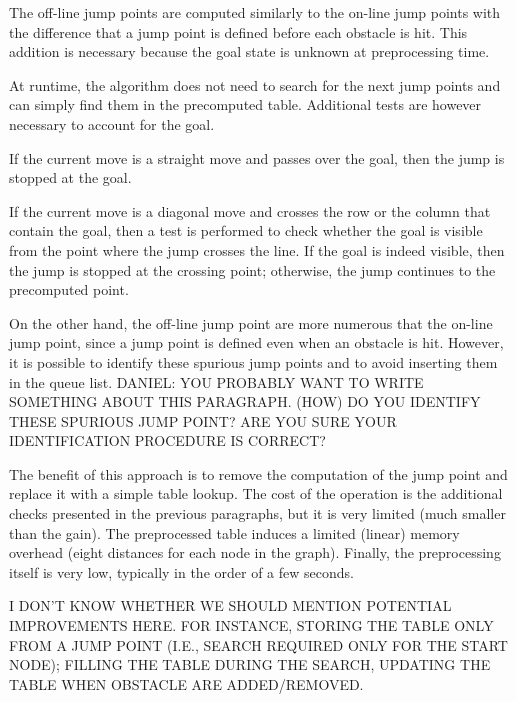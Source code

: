 The off-line jump points are computed similarly to the on-line jump points 
with the difference that a jump point is defined before each obstacle is hit.  
This addition is necessary 
because the goal state is unknown at preprocessing time.  

At runtime, the algorithm does not need to search for the next jump points 
and can simply find them in the precomputed table.  
Additional tests are however necessary to account for the goal.  

If the current move is a straight move 
and passes over the goal, 
then the jump is stopped at the goal.  

If the current move is a diagonal move 
and crosses the row or the column that contain the goal, 
then a test is performed to check 
whether the goal is visible from the point 
where the jump crosses the line.  
If the goal is indeed visible, 
then the jump is stopped at the crossing point; 
otherwise, the jump continues to the precomputed point.  

On the other hand, the off-line jump point are more numerous 
that the on-line jump point, 
since a jump point is defined even when an obstacle is hit.  
However, it is possible to identify these spurious jump points 
and to avoid inserting them in the queue list.  
DANIEL: YOU PROBABLY WANT TO WRITE SOMETHING ABOUT THIS PARAGRAPH.  
(HOW) DO YOU IDENTIFY THESE SPURIOUS JUMP POINT?  
ARE YOU SURE YOUR IDENTIFICATION PROCEDURE IS CORRECT?  

The benefit of this approach is to remove the computation of the jump point 
and replace it with a simple table lookup.  
The cost of the operation is the additional checks 
presented in the previous paragraphs, 
but it is very limited (much smaller than the gain).  
The preprocessed table induces a limited (linear) memory overhead 
(eight distances for each node in the graph).  
Finally, the preprocessing itself is very low, 
typically in the order of a few seconds.  

I DON'T KNOW WHETHER WE SHOULD MENTION POTENTIAL IMPROVEMENTS HERE.  
FOR INSTANCE, STORING THE TABLE ONLY FROM A JUMP POINT 
(I.E., SEARCH REQUIRED ONLY FOR THE START NODE); 
FILLING THE TABLE DURING THE SEARCH, 
UPDATING THE TABLE WHEN OBSTACLE ARE ADDED/REMOVED.  
